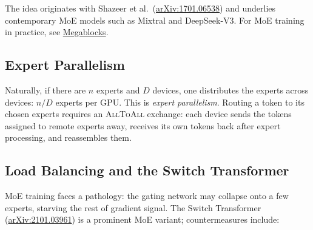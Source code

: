\documentclass[11pt,a4paper]{article}
\theoremstyle{definition}
\theoremstyle{remark}
\theoremstyle{plain}
\begin{document}
\begin{center}
\end{center}

The idea originates with Shazeer et al.\
(\href{https://arxiv.org/pdf/1701.06538.pdf}{arXiv:1701.06538}) and
underlies contemporary MoE models such as Mixtral and DeepSeek-V3. For
MoE training in practice, see
\href{https://github.com/databricks/megablocks}{Megablocks}.

\subsection{Expert Parallelism}

Naturally, if there are $n$ experts and $D$ devices, one distributes the
experts across devices: $n/D$ experts per GPU. This is \emph{expert
parallelism}. Routing a token to its chosen experts requires an
\textsc{AllToAll} exchange: each device sends the tokens assigned to
remote experts away, receives its own tokens back after expert
processing, and reassembles them.

\subsection{Load Balancing and the Switch Transformer}

MoE training faces a pathology: the gating network may collapse onto a
few experts, starving the rest of gradient signal. The Switch Transformer
(\href{https://arxiv.org/pdf/2101.03961.pdf}{arXiv:2101.03961}) is a
prominent MoE variant; countermeasures include:
\end{document}
